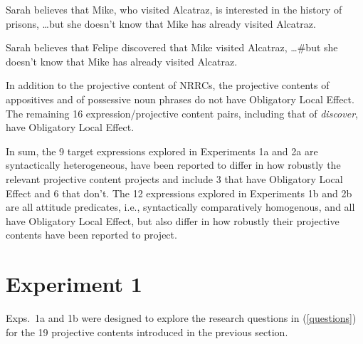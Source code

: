 \documentclass[11pt,fleqn]{article}
\newcommand{\6}{\mbox{$[\hspace*{-.6mm}[$}}
\newcommand{\9}{\mbox{$]\hspace*{-.6mm}]$}}
\begin{document}
\begin{exe}
\ex\label{ole}
\begin{xlist}
\ex Sarah believes that Mike, who visited Alcatraz, is interested in the history of prisons, \ldots but she doesn't know that Mike has already visited Alcatraz.

\ex Sarah believes that Felipe discovered that Mike visited Alcatraz, \ldots \#but she doesn't know that Mike has already visited Alcatraz. 

\end{xlist}
\end{exe}
In addition to the projective content of NRRCs, the projective contents of appositives and of possessive noun phrases do not have Obligatory Local Effect. The remaining 16 expression/projective content pairs, including that of {\em discover}, have Obligatory Local Effect. 

In sum, the 9 target expressions explored in Experiments 1a and 2a are syntactically heterogeneous, have been reported to differ in how robustly the relevant projective content projects and include 3 that have Obligatory Local Effect and 6 that don't. The 12 expressions explored in Experiments 1b and 2b are all attitude predicates, i.e., syntactically comparatively homogenous, and all have Obligatory Local Effect, but also differ in how robustly their projective contents have been reported to project.


\section{Experiment 1}
\label{s3}

Exps.~1a and 1b were designed to explore the research questions in (\ref{questions}) for the 19 projective contents introduced in the previous section.
\end{document}

